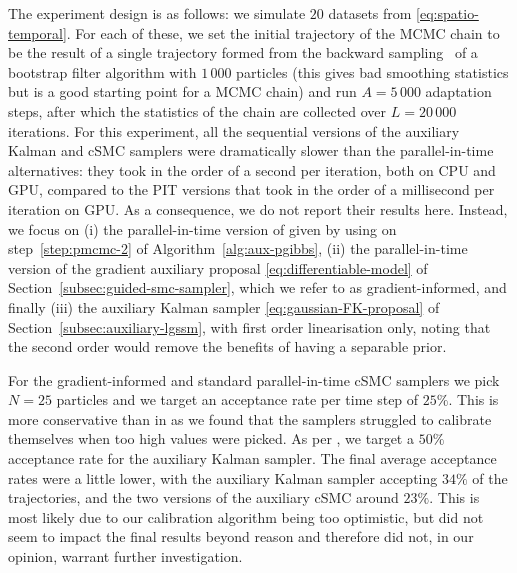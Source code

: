 The experiment design is as follows: we simulate $20$ datasets from \eqref{eq:spatio-temporal}. For each of these, we set the initial trajectory of the MCMC chain to be the result of a single trajectory formed from the backward sampling~\citep{Godsill2004FFBS} of a bootstrap filter algorithm with $1\,000$ particles (this gives bad smoothing statistics but is a good starting point for a MCMC chain) and run $A=5\,000$ adaptation steps, after which the statistics of the chain are collected over $L = 20\,000$ iterations.
For this experiment, all the sequential versions of the auxiliary Kalman and cSMC samplers were dramatically slower than the parallel-in-time alternatives: they took in the order of a second per iteration, both on CPU and GPU, compared to the PIT versions that took in the order of a millisecond per iteration on GPU. As a consequence, we do not report their results here. Instead, we focus on (i) the parallel-in-time version of \citet{finke2021csmc} given by using \citet{corenflos2022sequentialized} on step~\ref{step:pmcmc-2} of Algorithm~\ref{alg:aux-pgibbs}, (ii) the parallel-in-time version of the gradient auxiliary proposal \eqref{eq:differentiable-model} of Section~\ref{subsec:guided-smc-sampler}, which we refer to as gradient-informed, and finally (iii) the auxiliary Kalman sampler \eqref{eq:gaussian-FK-proposal} of Section~\ref{subsec:auxiliary-lgssm}, with first order linearisation only, noting that the second order would remove the benefits of having a separable prior.

For the gradient-informed and standard parallel-in-time cSMC samplers we pick $N=25$ particles and we target an acceptance rate per time step of $25\%$. This is more conservative than in \citet{finke2021csmc} as we found that the samplers struggled to calibrate themselves when too high values were picked. As per \citet{titsias2018}, we target a $50\%$ acceptance rate for the auxiliary Kalman sampler.
The final average acceptance rates were a little lower, with the auxiliary Kalman sampler accepting $34\%$ of the trajectories, and the two versions of the auxiliary cSMC around $23\%$. This is most likely due to our calibration algorithm being too optimistic, but did not seem to impact the final results beyond reason and therefore did not, in our opinion, warrant further investigation.

